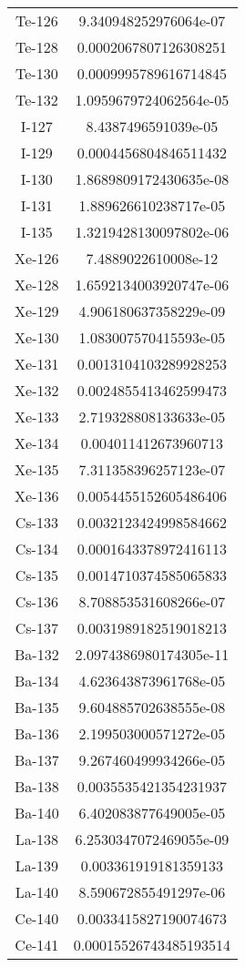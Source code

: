 \begin{table}[h!]
\begin{tabular}{|| c || c |}
Te-126 & 9.340948252976064e-07 \\
Te-128 & 0.0002067807126308251 \\
Te-130 & 0.0009995789616714845 \\
Te-132 & 1.0959679724062564e-05 \\
I-127 & 8.4387496591039e-05 \\
I-129 & 0.0004456804846511432 \\
I-130 & 1.8689809172430635e-08 \\
I-131 & 1.889626610238717e-05 \\
I-135 & 1.3219428130097802e-06 \\
Xe-126 & 7.4889022610008e-12 \\
Xe-128 & 1.6592134003920747e-06 \\
Xe-129 & 4.906180637358229e-09 \\
Xe-130 & 1.083007570415593e-05 \\
Xe-131 & 0.0013104103289928253 \\
Xe-132 & 0.0024855413462599473 \\
Xe-133 & 2.719328808133633e-05 \\
Xe-134 & 0.004011412673960713 \\
Xe-135 & 7.311358396257123e-07 \\
Xe-136 & 0.0054455152605486406 \\
Cs-133 & 0.0032123424998584662 \\
Cs-134 & 0.0001643378972416113 \\
Cs-135 & 0.0014710374585065833 \\
Cs-136 & 8.708853531608266e-07 \\
Cs-137 & 0.0031989182519018213 \\
Ba-132 & 2.0974386980174305e-11 \\
Ba-134 & 4.623643873961768e-05 \\
Ba-135 & 9.604885702638555e-08 \\
Ba-136 & 2.199503000571272e-05 \\
Ba-137 & 9.267460499934266e-05 \\
Ba-138 & 0.0035535421354231937 \\
Ba-140 & 6.402083877649005e-05 \\
La-138 & 6.2530347072469055e-09 \\
La-139 & 0.003361919181359133 \\
La-140 & 8.590672855491297e-06 \\
Ce-140 & 0.0033415827190074673 \\
Ce-141 & 0.00015526743485193514 \\

\end{tabular}
\end{table}
